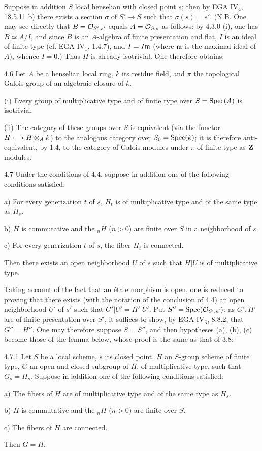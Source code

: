  Suppose in addition $S$ local henselian with closed point $s$; then by EGA IV$_4$, 18.5.11 b) there exists a section $\sigma$ of $S'\to S$ such that $\sigma(s)=s'$. (N.B. One may see directly that $B=\mathcal{O}_{S',s'}$ equals $A=\mathcal{O}_{S,s}$ as follows: by 4.3.0 (i), one has $B\simeq A/I$, and since $B$ is an $A$-algebra of finite presentation and flat, $I$ is an ideal of finite type (cf. EGA IV$_1$, 1.4.7), and $I=I\mathfrak m$ (where $\mathfrak m$ is the maximal ideal of $A$), whence $I=0$.) Thus $H$ is already isotrivial. One therefore obtains:
\begin{corollary}{4.6}\label{X.4.6}
Let $A$ be a henselian local ring, $k$ its residue field, and $\pi$ the topological Galois group of an algebraic closure of $k$.

(i) Every group of multiplicative type and of finite type over $S=\operatorname{Spec}(A)$ is isotrivial.

(ii) The category of these groups over $S$ is equivalent (via the functor $H\longmapsto H\otimes_A k$) to the analogous category over $S_0=\operatorname{Spec}(k)$; it is therefore anti-equivalent, by 1.4, to the category of Galois modules under $\pi$ of finite type as $\mathbf{Z}$-modules.
\end{corollary}
\begin{corollary}{4.7}\label{X.4.7}
Under the conditions of 4.4, suppose in addition one of the following conditions satisfied:

a) For every generization $t$ of $s$, $H_t$ is of multiplicative type and of the same type as $H_s$.

b) $H$ is commutative and the ${}_nH$ ($n>0$) are finite over $S$ in a neighborhood of $s$.

c) For every generization $t$ of $s$, the fiber $H_t$ is connected.

Then there exists an open neighborhood $U$ of $s$ such that $H|U$ is of multiplicative type.
\end{corollary}
Taking account of the fact that an étale morphism is open, one is reduced to proving that there exists (with the notation of the conclusion of 4.4) an open neighborhood $U'$ of $s'$ such that $G'|U'=H'|U'$. Put $S''=\operatorname{Spec}(\mathcal{O}_{S',s'})$; as $G',H'$ are of finite presentation over $S'$, it suffices to show, by EGA IV$_3$, 8.8.2, that $G''=H''$. One may therefore suppose $S=S''$, and then hypotheses (a), (b), (c) become those of the lemma below, whose proof is the same as that of 3.8:
\begin{lemma}{4.7.1}\label{X.4.7.1}
Let $S$ be a local scheme, $s$ its closed point, $H$ an $S$-group scheme of finite type, $G$ an open and closed subgroup of $H$, of multiplicative type, such that $G_s=H_s$. Suppose in addition one of the following conditions satisfied:

a) The fibers of $H$ are of multiplicative type and of the same type as $H_s$.

b) $H$ is commutative and the ${}_nH$ ($n>0$) are finite over $S$.

c) The fibers of $H$ are connected.

Then $G=H$.
\end{lemma}
